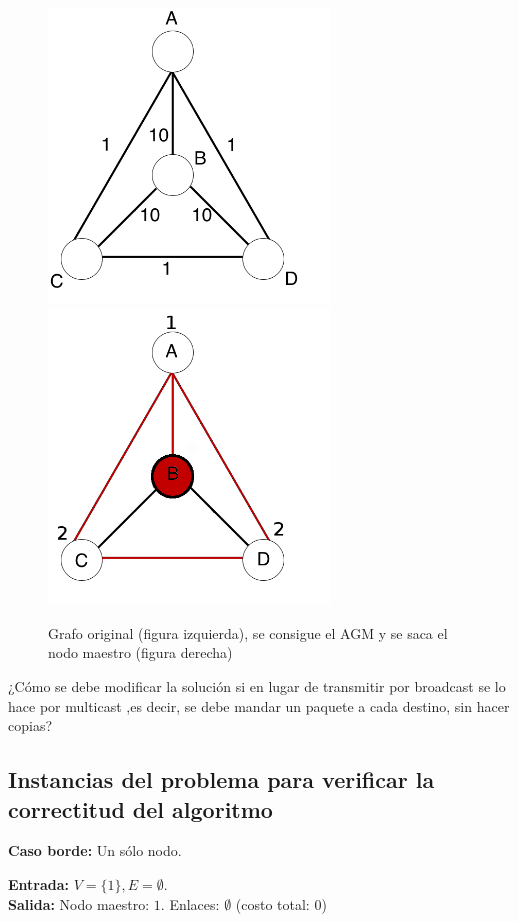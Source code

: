 \documentclass[a4paper, 10pt, twoside]{article}
\begin{document}
\begin{figure}[H]
\centering
\includegraphics[width=75mm]{contraej.png}
\includegraphics[width=75mm]{contraejAGM.png}
\caption{Grafo original (figura izquierda), se consigue el AGM y se saca el nodo maestro (figura derecha)}
\end{figure} 

¿Cómo se debe modificar la solución si en lugar de transmitir por broadcast se lo hace por
multicast ,es decir, se debe mandar un paquete a cada destino, sin hacer copias?


\subsection{Instancias del problema para verificar la correctitud del algoritmo}

\textbf{Caso borde:} Un sólo nodo.

\textbf{Entrada:} $V = \{ 1 \}, E = \emptyset$. \\
\textbf{Salida:}  Nodo maestro: $1$. Enlaces: $\emptyset$ (costo total: 0)
\\
\end{document}
